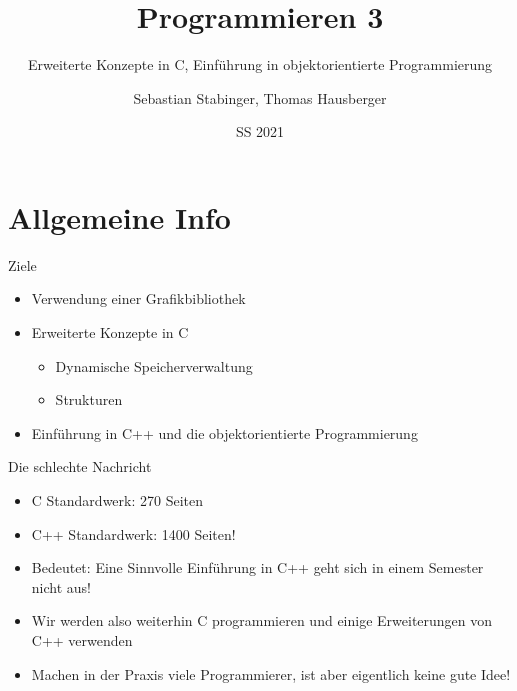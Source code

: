 \documentclass[presentation]{beamer}
\author{Sebastian Stabinger, Thomas Hausberger}
\date{SS 2021}
\title{Programmieren 3}
\subtitle{Erweiterte Konzepte in C, Einführung in objektorientierte Programmierung}
\begin{document}
\maketitle

\section{Allgemeine Info}
\label{sec:org435cb95}
\begin{frame}[label={sec:org6ce379c}]{Ziele}
\begin{itemize}
\item Verwendung einer Grafikbibliothek
\item Erweiterte Konzepte in C
\begin{itemize}
\item Dynamische Speicherverwaltung
\item Strukturen
\end{itemize}
\item Einführung in C++ und die objektorientierte Programmierung
\end{itemize}
\begin{block}{Die schlechte Nachricht}
\begin{itemize}
\item C Standardwerk: 270 Seiten
\item C++ Standardwerk: \alert{1400 Seiten!}
\item \alert{Bedeutet:} Eine Sinnvolle Einführung in C++ geht sich in einem
Semester nicht aus!
\item Wir werden also weiterhin C programmieren und einige Erweiterungen
von C++ verwenden
\item Machen in der Praxis viele Programmierer, ist aber \alert{eigentlich keine
gute Idee}!
\end{itemize}
\end{block}
\end{frame}
\end{document}
